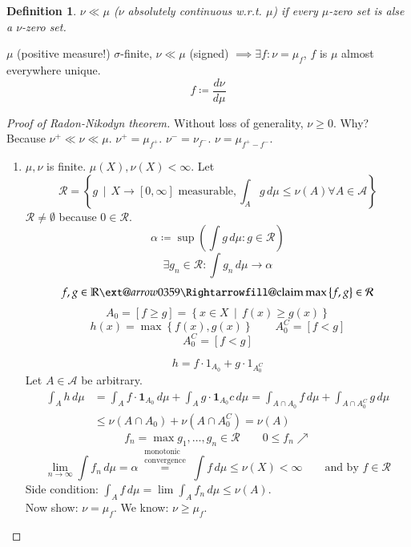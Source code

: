 \documentclass[a4paper]{article}
\makeatletter
\newcounter{lecref}[section]
\numberwithin{lecref}{section}
\theoremstyle{break}
\newtheorem{definition}[lecref]{Definition}
\newcommand{\Set}[1]{\left\{#1\right\}}
\newcommand{\SetDef}[2]{\left\{#1\,\mid\,#2\right\}}
\newcommand{\xRightarrow}[2][]{\ext@arrow 0359\Rightarrowfill@{#1}{#2}}
\makeatother
\begin{document}
\begin{definition}
  $\nu \ll \mu$ ($\nu$ absolutely continuous w.r.t. $\mu$) if every $\mu$-zero set is alse a $\nu$-zero set.
\end{definition}

\begin{theorem}
  $\mu$ (positive measure!) $\sigma$-finite,
  $\nu \ll \mu$ (signed) $\implies \exists f: \nu = \mu_f$, $f$ is $\mu$ almost everywhere unique.
  \[ f \coloneqq \frac{d\nu}{d\mu} \]
\end{theorem}

\begin{proof}[Proof of Radon-Nikodyn theorem]
  Without loss of generality, $\nu \geq 0$. Why? Because $\nu^+ \ll \nu \ll \mu$. $\nu^+ = \mu_{f^+}$. $\nu^- = \nu_{f^-}$. $\nu = \mu_{f^+ - f^-}$.
  \begin{enumerate}
    \item $\mu, \nu$ is finite. $\mu(X), \nu(X) < \infty$. Let
      \[ \mathcal R = \SetDef{g}{X \to [0, \infty] \text{ measurable}, \int_A g \, d\mu \leq \nu(A) \forall A \in \mathcal A} \]
      $\mathcal R \neq \emptyset$ because $0 \in \mathcal R$.
      \[ \alpha \coloneqq \sup\left(\int g \, d\mu: g \in \mathcal R\right) \]
      \[ \exists g_n \in \mathcal R: \int g_n \, d\mu \to \alpha \]
      \[ f, g \in \mathbb R \xRightarrow{\text{claim}} \max\Set{f, g} \in \mathcal R \]
      \[ A_0 = [f \geq g] = \SetDef{x \in X}{f(x) \geq g(x)} \]
      \[ h(x) = \max\Set{f(x), g(x)} \qquad A_0^C = [f < g] \]
      \[ A_0^C = [f < g] \]

      \[ h = f \cdot \mathcal 1_{A_0} + g \cdot \mathcal 1_{A_0^C} \]
      Let $A \in \mathcal A$ be arbitrary.
      \begin{align*}
        \int_A h \, d\mu &= \int_A f \cdot \mathbf 1_{A_0} \, d\mu + \int_A g \cdot \mathbf 1_{A_0} c \, d\mu = \int_{A \cap A_0} f \, d\mu + \int_{A \cap A_0^C} g \, d\mu \\
          &\leq \nu(A \cap A_0) + \nu(A \cap A_0^C) = \nu(A)
      \end{align*}
      \[ f_n = \max{g_1, \dots, g_n} \in \mathcal R \qquad 0 \leq f_n \nearrow \]
      \[ \lim_{n \to \infty} \int f_n \, d\mu = \alpha \overset{\substack{\text{monotonic} \\ \text{convergence}}}= \int f \, d\mu \leq \nu(X) < \infty \qquad \text{and by } f \in \mathcal R \]
      Side condition: $\int_A f \, d\mu = \lim \int_A f_n \, d\mu \leq \nu(A)$. \\
      Now show: $\nu = \mu_f$. We know: $\nu \geq \mu_f$.


\end{enumerate}
\end{proof}
\end{document}
